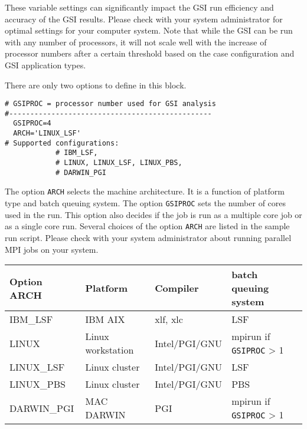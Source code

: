 These variable settings can significantly impact the GSI run efficiency and accuracy of the GSI results. Please check with your system administrator for optimal settings for your computer system. Note that while the GSI can be run with any number of processors, it will not scale well with the increase of processor numbers after a certain threshold based on the case configuration and GSI application types.


There are only two options to define in this block. 

\begin{footnotesize}
\begin{verbatim}
# GSIPROC = processor number used for GSI analysis
#------------------------------------------------
  GSIPROC=4
  ARCH='LINUX_LSF'
# Supported configurations:
            # IBM_LSF,
            # LINUX, LINUX_LSF, LINUX_PBS,
            # DARWIN_PGI
\end{verbatim}
\end{footnotesize}

The option \verb|ARCH| selects the machine architecture. It is a function of platform type and batch queuing system. The option \verb|GSIPROC| sets the number of cores used in the run. This option also decides if the job is run as a multiple core job or as a single core run. Several choices of the option \verb|ARCH| are listed in the sample run script. Please check with your system administrator about running parallel MPI jobs on your system.

\begin{table}[htbp]
\centering
\begin{footnotesize}
\begin{tabular}{|p{3cm}|p{4cm}|p{3cm}|p{4cm}|}
\hline
\hline
Option ARCH & Platform & Compiler & batch queuing system \\
\hline
\hline
IBM\_LSF & IBM AIX & xlf, xlc & LSF \\
\hline
LINUX & Linux workstation & Intel/PGI/GNU & mpirun if \verb|GSIPROC| > 1 \\
\hline
LINUX\_LSF & Linux cluster & Intel/PGI/GNU & LSF \\
\hline
LINUX\_PBS & Linux cluster & Intel/PGI/GNU & PBS \\
\hline
DARWIN\_PGI & MAC DARWIN & PGI	& mpirun if \verb|GSIPROC| > 1 \\
\hline
\end{tabular}
\label{t36}
\end{footnotesize}
\end{table} 

